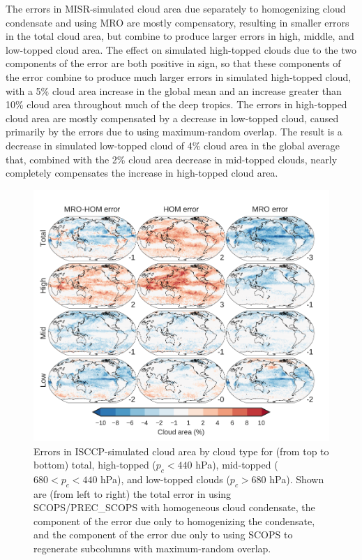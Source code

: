 The errors in MISR-simulated cloud area due separately to homogenizing
cloud condensate and using MRO are mostly compensatory, resulting in
smaller errors in the total cloud area, but combine to produce larger
errors in high, middle, and low-topped cloud area. The effect on
simulated high-topped clouds due to the two components of the error are
both positive in sign, so that these components of the error combine to
produce much larger errors in simulated high-topped cloud, with a 5\%
cloud area increase in the global mean and an increase greater than 10\%
cloud area throughout much of the deep tropics. The errors in
high-topped cloud area are mostly compensated by a decrease in
low-topped cloud, caused primarily by the errors due to using
maximum-random overlap. The result is a decrease in simulated low-topped
cloud of 4\% cloud area in the global average that, combined with the
2\% cloud area decrease in mid-topped clouds, nearly completely
compensates the increase in high-topped cloud area.

\begin{figure}[htbp]
\centering
\includegraphics{graphics/subgrid1_cldisccp_maps_diff.pdf}
\caption{\label{fig:subgrid1_cldisccp_errors}Errors in ISCCP-simulated
cloud area by cloud type for (from top to bottom) total, high-topped
(\(p_c < 440\) hPa), mid-topped (\(680 < p_c < 440\) hPa), and
low-topped clouds (\(p_c > 680\) hPa). Shown are (from left to right)
the total error in using SCOPS/PREC\_SCOPS with homogeneous cloud
condensate, the component of the error due only to homogenizing the
condensate, and the component of the error due only to using SCOPS to
regenerate subcolumns with maximum-random
overlap.}\label{fig:subgrid1ux5fcldisccpux5ferrors}
\end{figure}

